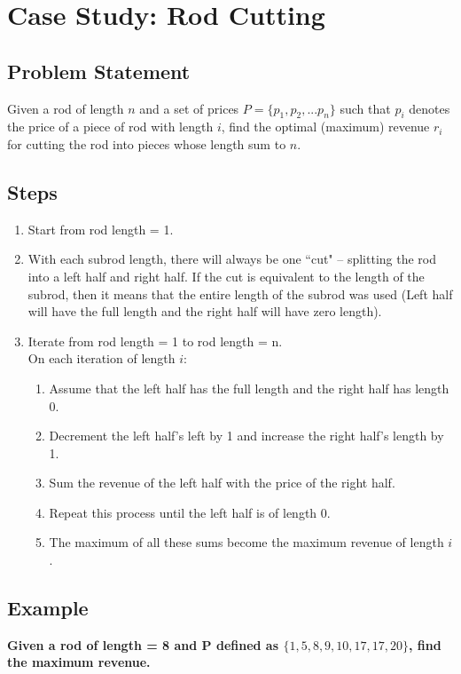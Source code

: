 \section{Case Study: Rod Cutting}

\subsection*{Problem Statement}
Given a rod of length $n$ and a set of prices $P = \{ p_1, p_2, ... p_n \}$ such that $p_i$ denotes the price of a piece of rod with length $i$, find the optimal (maximum)  revenue $r_i$ for cutting the rod into pieces whose length sum to $n$.

\subsection*{Steps}
\begin{enumerate}
	\item Start from rod length = 1.
	\item With each subrod length, there will always be one ``cut" -- splitting the rod into a left half and right half. If the cut is equivalent to the length of the subrod, then it means that the entire length of the subrod was used (Left half will have the full length and the right half will have zero length). 
	\item Iterate from rod length = 1 to rod length = n.\\
		On each iteration of length $i$:
	\begin{enumerate}
		\item Assume that the left half has the full length and the right half has length 0.
		\item Decrement the left half's left by 1 and increase the right half's length by 1.
		\item Sum the revenue of the left half with the price of the right half.
		\item Repeat this process until the left half is of length 0.
		\item The maximum of all these sums become the maximum revenue of length $i$.
	\end{enumerate}
\end{enumerate}

\newpage

\subsection{Example}
\textbf{Given a rod of length = 8 and P defined as $\{ 1, 5, 8, 9, 10, 17, 17, 20 \}$, find the maximum revenue.}

